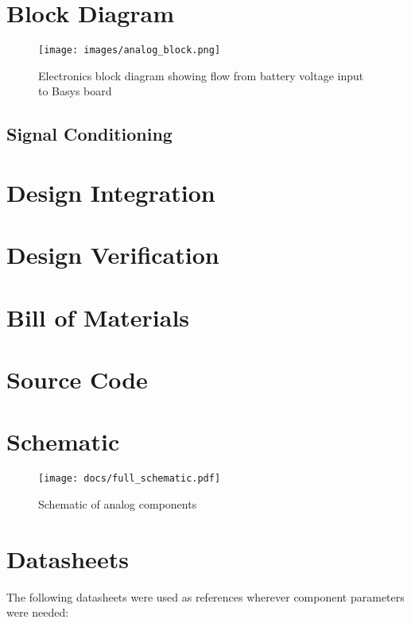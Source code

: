 \documentclass[12pt]{article}
\numberwithin{figure}{section}
\numberwithin{equation}{section}
\begin{document}
\section{Block Diagram} 
\begin{figure}[ht] 
    \centering
    \texttt{[image: images/analog\_block.png]}
    \caption{Electronics block diagram showing flow from battery voltage input to Basys board}
\end{figure} 

\subsection{Signal Conditioning} 

\section{Design Integration} 

\section{Design Verification} 


\section{Bill of Materials}

\section{Source Code}
    
\section{Schematic} 
\begin{figure}[H] 
    \centering 
    \texttt{[image: docs/full\_schematic.pdf]}
    \caption{Schematic of analog components} 
    \label{schematic}
\end{figure}

\section{Datasheets}
The following datasheets were used as references wherever component parameters were needed: 
\end{document}
